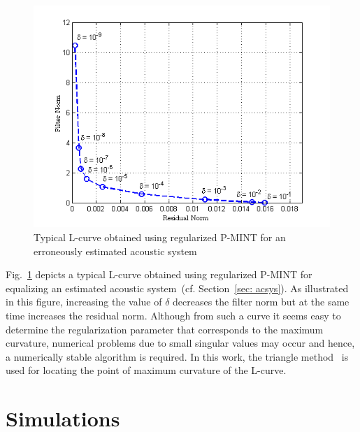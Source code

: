 \documentclass[10pt]{IEEEtran}
\begin{document}
\begin{figure}[t!]
\centering
\includegraphics[scale = 0.57]{Plots/lcurve_ex}
\caption{Typical L-curve obtained using regularized P-MINT for an erroneously estimated acoustic system}
\label{fig: lcurveex}
\end{figure}
Fig.~\ref{fig: lcurveex} depicts a typical L-curve obtained using regularized P-MINT for equalizing an estimated acoustic system~(cf. Section~\ref{sec: acsys}).
As illustrated in this figure, increasing the value of $\delta$ decreases the filter norm but at the same time increases the residual norm.
Although from such a curve it seems easy to determine the regularization parameter that corresponds to the maximum curvature, numerical problems due to small singular values may occur and hence, a numerically stable algorithm is required.
In this work, the triangle method~\cite{Castellanos_2002} is used for locating the point of maximum curvature of the L-curve.

\section{Simulations}
\label{sec: exp}
\end{document}

